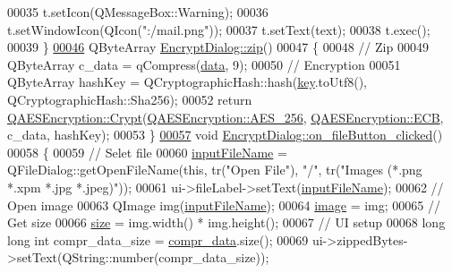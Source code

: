 \begin{DoxyCode}
00035     t.setIcon(QMessageBox::Warning);
00036     t.setWindowIcon(QIcon(\textcolor{stringliteral}{":/mail.png"}));
00037     t.setText(text);
00038     t.exec();
00039 \}
\hypertarget{encryptdialog_8cpp_source.tex_l00046}{}\hyperlink{class_encrypt_dialog_a2bff820a3df4ddc36ecb07ed74b7138a}{00046} QByteArray \hyperlink{class_encrypt_dialog_a2bff820a3df4ddc36ecb07ed74b7138a}{EncryptDialog::zip}()
00047 \{
00048     \textcolor{comment}{// Zip}
00049     QByteArray c\_data = qCompress(\hyperlink{class_encrypt_dialog_acf3a8bbce90d99ef17fec093c35b1008}{data}, 9);
00050     \textcolor{comment}{// Encryption}
00051     QByteArray hashKey = QCryptographicHash::hash(\hyperlink{class_encrypt_dialog_a1afdef3c665fb0d0fae06d1df8e84951}{key}.toUtf8(), QCryptographicHash::Sha256);
00052     \textcolor{keywordflow}{return} \hyperlink{class_q_a_e_s_encryption_a43819eeb6a7cb29fbd3cb6ad640dcbdf}{QAESEncryption::Crypt}(\hyperlink{class_q_a_e_s_encryption_abe48208f4f6c7d68e6a10b49b9d0b7bdacde97774ab1d4c609e04b0dd13a1e1f7}{QAESEncryption::AES\_256}, 
      \hyperlink{class_q_a_e_s_encryption_ad3e031c49a3d56566379d75b40b7b255a4ca7f51778e2adf1f464164a0ba8e75e}{QAESEncryption::ECB}, c\_data, hashKey);
00053 \}
\hypertarget{encryptdialog_8cpp_source.tex_l00057}{}\hyperlink{class_encrypt_dialog_ac9817d3f11f44f4bb8d97a228fbdf8a5}{00057} \textcolor{keywordtype}{void} \hyperlink{class_encrypt_dialog_ac9817d3f11f44f4bb8d97a228fbdf8a5}{EncryptDialog::on\_fileButton\_clicked}()
00058 \{
00059     \textcolor{comment}{// Selet file}
00060     \hyperlink{class_encrypt_dialog_a859b1bc2f032a247632b879bf8663d0b}{inputFileName} = QFileDialog::getOpenFileName(\textcolor{keyword}{this}, tr(\textcolor{stringliteral}{"Open File"}), \textcolor{stringliteral}{"/"}, tr(\textcolor{stringliteral}{"Images (*.png
       *.xpm *.jpg *.jpeg)"}));
00061     ui->fileLabel->setText(\hyperlink{class_encrypt_dialog_a859b1bc2f032a247632b879bf8663d0b}{inputFileName});
00062     \textcolor{comment}{// Open image}
00063     QImage img(\hyperlink{class_encrypt_dialog_a859b1bc2f032a247632b879bf8663d0b}{inputFileName});
00064     \hyperlink{class_encrypt_dialog_a739a0df1d28d06b28a3fd16e2bc16c73}{image} = img;
00065     \textcolor{comment}{// Get size}
00066     \hyperlink{class_encrypt_dialog_a7fff26f838ab50f807744cd2c4bed033}{size} = img.width() * img.height();
00067     \textcolor{comment}{// UI setup}
00068     \textcolor{keywordtype}{long} \textcolor{keywordtype}{long} \textcolor{keywordtype}{int} compr\_data\_size = \hyperlink{class_encrypt_dialog_a3e8998aa39696cbd1242f6420ef18143}{compr\_data}.size();
00069     ui->zippedBytes->setText(QString::number(compr\_data\_size));

\end{DoxyCode}
